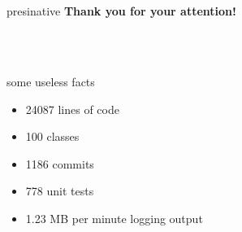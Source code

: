 \documentclass[hyperref={pdfpagelabels=false},compress]{beamer}
\begin{document}
\section{}
\begin{frame}
	\hfill
	\begin{beamercolorbox}[shadow=true, rounded=true, wd=10cm]{presinative}
		\centering
		\Large{\textbf{Thank you for your attention!}}
	\end{beamercolorbox}
	\hfill \\
	\hfill \\
	\begin{block}{some useless facts}
		\begin{itemize}
			\item 24087 lines of code
			\item 100 classes
			\item 1186 commits
			\item 778 unit tests
			\item 1.23 MB per minute logging output
		\end{itemize}
	\end{block}
\end{frame}
\end{document}
